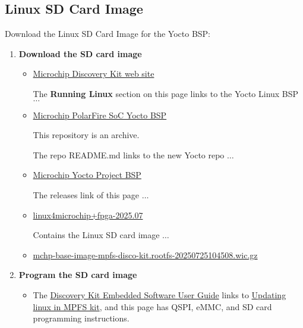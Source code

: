 \clearpage
\subsection{Linux SD Card Image}

Download the Linux SD Card Image for the Yocto BSP:
%
\begin{enumerate}
\item \textbf{Download the SD card image}
%
\begin{itemize}
\item
\href{https://www.microchip.com/en-us/development-tool/mpfs-disco-kit}
{Microchip Discovery Kit web site}

The \textbf{Running Linux} section on this page links to the Yocto Linux
BSP $\dots$

\item
\href{https://github.com/polarfire-soc/meta-polarfire-soc-yocto-bsp}
{Microchip PolarFire SoC Yocto BSP}

This repository is an archive.

The repo README.md links to the new Yocto repo $\dots$

\item
\href{https://github.com/linux4microchip/meta-mchp}
{Microchip Yocto Project BSP}

The releases link of this page $\dots$

\item
\href{https://github.com/linux4microchip/meta-mchp/releases/tag/linux4microchip%2Bfpga-2025.07}
{linux4microchip+fpga-2025.07}

Contains the Linux SD card image $\dots$

\item
\href{https://github.com/linux4microchip/meta-mchp/releases/download/linux4microchip+fpga-2025.07/mchp-base-image-mpfs-disco-kit.rootfs-20250725104508.wic.gz}
{mchp-base-image-mpfs-disco-kit.rootfs-20250725104508.wic.gz}
\end{itemize}
%
\item \textbf{Program the SD card image}
%
\begin{itemize}
\item The
\href{https://github.com/polarfire-soc/polarfire-soc-documentation/blob/master/reference-designs-fpga-and-development-kits/mpfs-discovery-kit-embedded-software-user-guide.md}
{Discovery Kit Embedded Software User Guide} links to
\href{https://github.com/polarfire-soc/polarfire-soc-documentation/blob/master/reference-designs-fpga-and-development-kits/updating-linux-in-mpfs-kit.md}
{Updating linux in MPFS kit}, and this page has QSPI, eMMC, and SD card programming instructions.


\end{itemize}
\end{enumerate}
